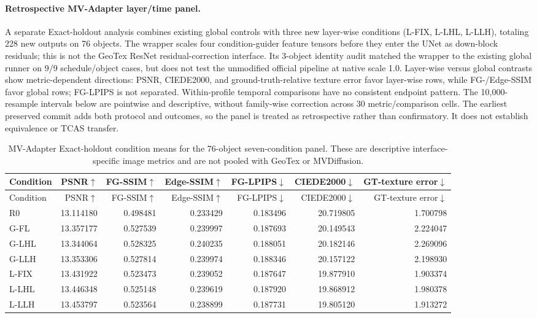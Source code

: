 \paragraph{Retrospective MV-Adapter layer/time panel.} A separate Exact-holdout analysis combines existing global controls with three new layer-wise conditions (L-FIX, L-LHL, L-LLH), totaling 228 new outputs on 76 objects. The wrapper scales four condition-guider feature tensors before they enter the UNet as down-block residuals; this is not the GeoTex ResNet residual-correction interface. Its 3-object identity audit matched the wrapper to the existing global runner on 9/9 schedule/object cases, but does not test the unmodified official pipeline at native scale 1.0. Layer-wise versus global contrasts show metric-dependent directions: PSNR, CIEDE2000, and ground-truth-relative texture error favor layer-wise rows, while FG-/Edge-SSIM favor global rows; FG-LPIPS is not separated. Within-profile temporal comparisons have no consistent endpoint pattern. The 10,000-resample intervals below are pointwise and descriptive, without family-wise correction across 30 metric/comparison cells. The earliest preserved commit adds both protocol and outcomes, so the panel is treated as retrospective rather than confirmatory. It does not establish equivalence or TCAS transfer.
\begingroup\scriptsize
\begin{longtable}{lrrrrrr}
\caption{MV-Adapter Exact-holdout condition means for the 76-object seven-condition panel. These are descriptive interface-specific image metrics and are not pooled with GeoTex or MVDiffusion.}\label{tab:mvadapter-layerwise-means}\\
\toprule Condition & PSNR$\uparrow$ & FG-SSIM$\uparrow$ & Edge-SSIM$\uparrow$ & FG-LPIPS$\downarrow$ & CIEDE2000$\downarrow$ & GT-texture error$\downarrow$ \\
\midrule\endfirsthead
\toprule Condition & PSNR$\uparrow$ & FG-SSIM$\uparrow$ & Edge-SSIM$\uparrow$ & FG-LPIPS$\downarrow$ & CIEDE2000$\downarrow$ & GT-texture error$\downarrow$ \\
\midrule\endhead
R0 & 13.114180 & 0.498481 & 0.233429 & 0.183496 & 20.719805 & 1.700798 \\
G-FL & 13.357177 & 0.527539 & 0.239997 & 0.187693 & 20.149543 & 2.224047 \\
G-LHL & 13.344064 & 0.528325 & 0.240235 & 0.188051 & 20.182146 & 2.269096 \\
G-LLH & 13.353306 & 0.527814 & 0.239974 & 0.188346 & 20.157122 & 2.198930 \\
L-FIX & 13.431922 & 0.523473 & 0.239052 & 0.187647 & 19.877910 & 1.903374 \\
L-LHL & 13.446348 & 0.525148 & 0.239619 & 0.187920 & 19.868912 & 1.980378 \\
L-LLH & 13.453797 & 0.523564 & 0.238899 & 0.187731 & 19.805120 & 1.913272 \\
\bottomrule
\end{longtable}
